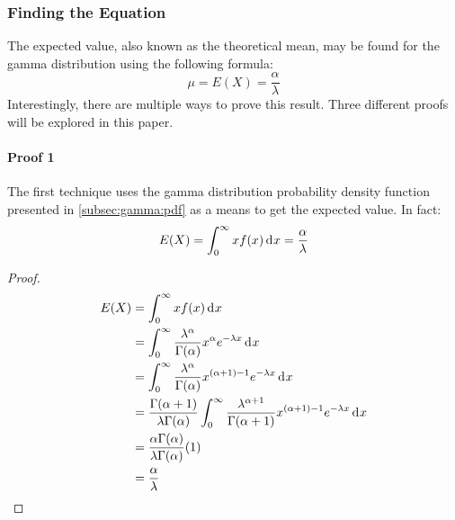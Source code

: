 \documentclass[12pt]{article}
\begin{document}
\subsubsection{Finding the Equation}
The expected value, also known as the theoretical mean, may be found for the gamma distribution using the following
formula:
\begin{equation}
	\mu = E(X) = \frac{\alpha}{\lambda}
\end{equation}
Interestingly, there are multiple ways to prove this result. Three different proofs will be explored in this paper.

\paragraph{Proof 1}\label{par:gamma:expected:proof1}
The first technique uses the gamma distribution probability density function presented in \autoref{subsec:gamma:pdf} as
a means to get the expected value. In fact:
\begin{equation}\label{eq:gamma:expected:proof1}
	E(X) = \int^\infty_0 xf(x)\mathop{}\!\mathrm{d^{}}x = \frac{\alpha}{\lambda}
\end{equation}
\begin{proof}
	\begin{equation}
		\begin{split}
			E(X)	&=	\int^\infty_0 xf(x)\mathop{}\!\mathrm{d^{}}x\\
					&=	\int^\infty_0 \frac{\lambda^\alpha}{\Gamma(\alpha)}x^\alpha e^{-\lambda x}\mathop{}\!\mathrm{d^{}}x\\
					&=	\int^\infty_0 \frac{\lambda^\alpha}{\Gamma(\alpha)}x^{(\alpha+1)-1} e^{-\lambda x}\mathop{}\!\mathrm{d^{}}x\\
					&=	\frac{\Gamma(\alpha+1)}{\lambda\Gamma(\alpha)}\int^\infty_0 \frac{\lambda^{\alpha+1}}{\Gamma(\alpha+1)}x^{(\alpha+1)-1} e^{-\lambda x}\mathop{}\!\mathrm{d^{}}x\\
					&=	\frac{\alpha\Gamma(\alpha)}{\lambda\Gamma(\alpha)}(1)\\
					&=	\frac{\alpha}{\lambda}
		\end{split}
	\end{equation}
\end{proof}
\end{document}
